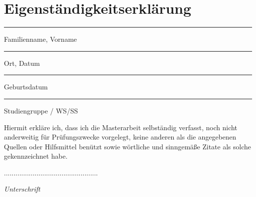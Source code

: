 \chapter{Eigenständigkeitserklärung}


\vspace{2cm}

\parbox{5cm}{\centering\hrule\medskip Familienname, Vorname}
\vspace{3cm}
\hfill
\parbox{5cm}{\centering\hrule\medskip Ort, Datum}

\vspace{-1cm}

\parbox{5cm}{\centering\hrule\medskip Geburtsdatum}
\vspace{3cm}
\hfill
\parbox{5cm}{\centering\hrule\medskip Studiengruppe / WS/SS}





\vspace{.5cm}

\flushleft

Hiermit erkläre ich, dass ich die Masterarbeit selbständig verfasst, noch nicht anderweitig
für Prüfungszwecke vorgelegt, keine anderen als die angegebenen Quellen oder Hilfsmittel
benützt sowie wörtliche und sinngemäße Zitate als solche gekennzeichnet habe.

\vspace{20mm}
\begin{flushright}
.................................................

\textit{Unterschrift}

\end{flushright}


